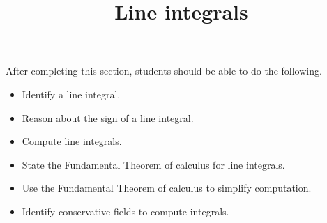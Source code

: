 \documentclass{ximera}
\title{Line integrals}
\begin{document}
\begin{abstract}
\end{abstract}
\maketitle

\begin{sectionOutcomes}

After completing this section, students should be able to do the following.

\begin{itemize}
\item Identify a line integral.
\item Reason about the sign of a line integral.
\item Compute line integrals.
\item State the Fundamental Theorem of calculus for line integrals.
\item Use the Fundamental Theorem of calculus to simplify computation.
\item Identify conservative fields to compute integrals.
\end{itemize}

\end{sectionOutcomes}
\end{document}
